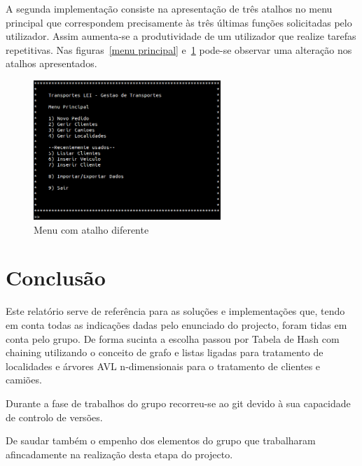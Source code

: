 \documentclass[a5paper,twocolumn, 11pt]{article}
\def\hyph{-\penalty0\hskip0pt\relax}
\begin{document}
A segunda implementação consiste na apresentação de três atalhos no menu principal que correspondem precisamente às três últimas funções solicitadas pelo utilizador. Assim aumenta-se a produtividade de um utilizador que realize tarefas repetitivas.
Nas figuras~\ref{menu principal} e~\ref{menu principal com atalho diferente} pode-se observar uma alteração nos atalhos apresentados.
\begin{figure}[hbt]
    \caption[Menu Principal (atalho)]{Menu com atalho diferente}
    \label{menu principal com atalho diferente}
    \centering
        \includegraphics[width=200pt]{menu_com_atalho_diferente.png}
\end{figure}



\clearpage
\section{Conclusão}
Este relatório serve de referência para as soluções e implementações que, tendo em conta todas as indicações dadas pelo enunciado do projecto, foram tidas em conta pelo grupo. De forma sucinta a escolha passou por Tabela de Hash com chaining utilizando o conceito de grafo e listas ligadas para tratamento de localidades e árvores AVL n\hyph{}dimensionais para o tratamento de clientes e camiões.

Durante a fase de trabalhos do grupo recorreu-se ao git devido à sua capacidade de controlo de versões.

De saudar também o empenho dos elementos do grupo que trabalharam afincadamente na realização desta etapa do projecto.

\clearpage
\onecolumn
\end{document}
